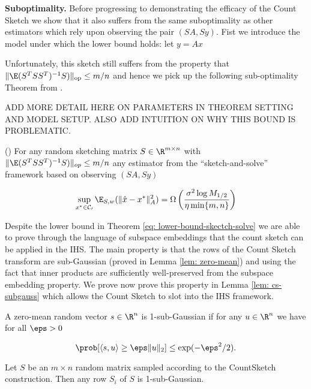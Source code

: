 \noindent\textbf{Suboptimality.}
Before progressing to demonstrating the efficacy of the Count Sketch we show
that it also suffers from the same suboptimality as other estimators which
rely upon observing the pair $(SA, Sy)$.
Fist we introduce the model under which the lower bound holds: let
$y = Ax$

Unfortunately, this sketch still suffers from the property that
$\| \E (S^T S S^T)^{-1} S) \|_{\text{op}} \le m/n$ and hence we pick up the following
sub-optimality Theorem from \cite{pilanci2016iterative}.

\color{red}
ADD MORE DETAIL HERE ON PARAMETERS IN THEOREM SETTING AND MODEL SETUP.
ALSO ADD INTUITION ON WHY THIS BOUND IS PROBLEMATIC.
\begin{thm}(\cite{pilanci2016iterative}) \label{eq: lower-bound-skectch-solve}
  For any random sketching matrix $S \in \R^{m \times n}$ with $\| \E (S^T S S^T)^{-1} S) \|_{op} \le m/n$
  any estimator from the ``sketch-and-solve'' framework based on observing  $(SA, Sy)$

  \begin{equation*}
    \sup_{x^* \in \mathcal{C_0}} \E_{S,w} (\| \hat{x} - x^* \|_A^2) =
              \Omega \left( \frac{\sigma^2 \log M_{1/2}}{\eta \min\{m,n\}} \right)
  \end{equation*}

\end{thm}
\color{black}

Despite the lower bound in Theorem \ref{eq: lower-bound-skectch-solve} we are
able to prove through the language of subspace
embeddings that the count sketch can be applied in the IHS.
The main property is that the rows of the Count Sketch transform are sub-Gaussian
(proved in Lemma \ref{lem: zero-mean}) and using the fact that inner products
are sufficiently well-preserved from the subspace embedding property.
We prove now prove this property in Lemma \ref{lem: cs-subgauss} which allows the
Count Sketch to slot into the IHS framework.

\begin{mydef}
  A zero-mean random vector $s \in \R^n$ is 1-sub-Gaussian if for any $u \in \R^n$
  we have for all $\eps > 0$

  \begin{equation}
    \prob [ \langle s, u \rangle \ge \eps \| u \|_2 ] \le \exp(-\eps^2/2).
  \end{equation}
\end{mydef}

\begin{Lemma} \label{lem: cs-subgauss}
  Let $S$ be an $m \times n$ random matrix sampled according to the CountSketch
  construction.
  Then any row $S_i$ of $S$ is 1-sub-Gaussian.
\end{Lemma}


